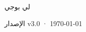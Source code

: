 \begin{titlepage}
\vfill
{\LARGE\sffamily لي بوجي\par}
\vspace{0.7cm}
{\small\sffamily\color{structurecolor!80} الإصدار v3.0 · \today\par}
\vspace{1.2cm}
\end{titlepage}
